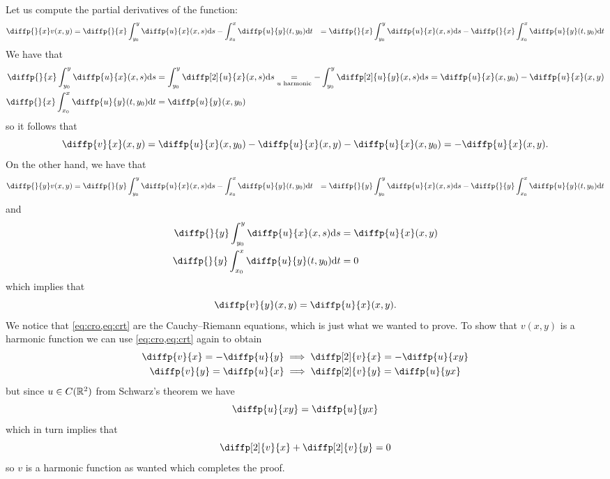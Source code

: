 \documentclass[11pt,a4paper]{article}
\begin{document}
\begin{solution}
  Let us compute the partial derivatives of the function:
  \begin{align*}
    \diffp{}{x} v(x,y) &= \diffp{}{x} \int_{y_0}^{y} \diffp{u}{x}(x,s) \ds -
    \int_{x_0}^{x} \diffp{u}{y}(t,y_0) \dt
                       &= \diffp{}{x} \int_{y_0}^{y} \diffp{u}{x}(x,s) \ds -
                          \diffp{}{x} \int_{x_0}^{x} \diffp{u}{y}(t,y_0) \dt
  \end{align*}
  We have that
  \begin{align*}
    \diffp{}{x} \int_{y_0}^{y} \diffp{u}{x}(x,s) \ds &=
    \int_{y_0}^{y} \diffp[2]{u}{x}(x,s) \ds \underset{u \text{ harmonic}}{=}
    - \int_{y_0}^{y} \diffp[2]{u}{y}(x,s) \ds =
    \diffp{u}{x}(x,y_0) - \diffp{u}{x}(x,y) \\
    \diffp{}{x} \int_{x_0}^{x} \diffp{u}{y}(t,y_0) \dt &=
    \diffp{u}{y}(x,y_0)
  \end{align*}
  so it follows that
  \begin{equation}
    \label{eq:cro}
    \diffp{v}{x}(x,y) =
    \diffp{u}{x}(x,y_0) - \diffp{u}{x}(x,y) - \diffp{u}{x}(x,y_0) =
    - \diffp{u}{x}(x,y).
  \end{equation}
  On the other hand, we have that
  \begin{align*}
    \diffp{}{y} v(x,y) &= \diffp{}{y} \int_{y_0}^{y} \diffp{u}{x}(x,s) \ds -
    \int_{x_0}^{x} \diffp{u}{y}(t,y_0) \dt
                       &= \diffp{}{y} \int_{y_0}^{y} \diffp{u}{x}(x,s) \ds -
                          \diffp{}{y} \int_{x_0}^{x} \diffp{u}{y}(t,y_0) \dt
  \end{align*}
  and
  \begin{align*}
    \diffp{}{y} \int_{y_0}^{y} \diffp{u}{x}(x,s) \ds &=
    \diffp{u}{x}(x,y) \\
    \diffp{}{y} \int_{x_0}^{x} \diffp{u}{y}(t,y_0) \dt &=
    0
  \end{align*}
  which implies that
  \begin{equation}
    \label{eq:crt}
    \diffp{v}{y}(x,y) = \diffp{u}{x}(x,y).
  \end{equation}
  We notice that \cref{eq:cro,eq:crt} are the Cauchy--Riemann equations,
  which is just what we wanted to prove.
  To show that $v(x,y)$ is a harmonic function we can use
  \cref{eq:cro,eq:crt} again to obtain
  \begin{gather}
    \diffp{v}{x} = - \diffp{u}{y} \implies \diffp[2]{v}{x} = - \diffp{u}{xy} \\
    \diffp{v}{y} = \diffp{u}{x} \implies 
    \diffp[2]{v}{y} = \diffp{u}{yx}
  \end{gather}
  but since $u \in C(\mathbb{R}^2)$ from Schwarz's theorem we have
  \[
    \diffp{u}{xy} = \diffp{u}{yx}
  \]
  which in turn implies that
  \[
    \diffp[2]{v}{x} + \diffp[2]{v}{y} = 0
  \]
  so $v$ is a harmonic function as wanted which completes the proof.
\end{solution}
\end{document}
